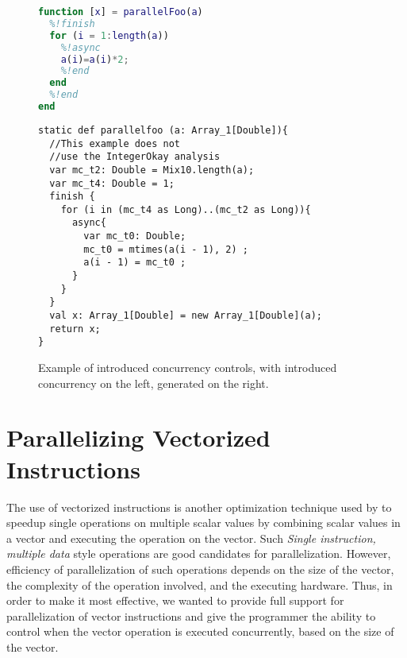 \begin{figure}[htbp]
\begin{minipage}{0.3\linewidth}

\begin{lstlisting}[language=Matlab,numbers=none]       
function [x] = parallelFoo(a)    
  %!finish
  for (i = 1:length(a))
    %!async
    a(i)=a(i)*2;
    %!end	
  end
  %!end
end                                                                             
\end{lstlisting}

\end{minipage}\hfill
\begin{minipage}{0.6\linewidth}
\begin{lstlisting}[language=X10,numbers=none]                                   
static def parallelfoo (a: Array_1[Double]){
  //This example does not 
  //use the IntegerOkay analysis
  var mc_t2: Double = Mix10.length(a);
  var mc_t4: Double = 1;
  finish {
    for (i in (mc_t4 as Long)..(mc_t2 as Long)){
      async{
        var mc_t0: Double;
        mc_t0 = mtimes(a(i - 1), 2) ;
        a(i - 1) = mc_t0 ;
      }
    }
  }
  val x: Array_1[Double] = new Array_1[Double](a);
  return x;
}
\end{lstlisting}
\end{minipage}

\caption{Example of introduced concurrency controls, \matlab with
introduced concurrency on the left, generated \xten on the right.}\label{fig:concex}
\end{figure}

\section{Parallelizing Vectorized Instructions} 
The use of vectorized instructions is another optimization technique
used by \matlab to speedup single operations on multiple scalar values by
combining scalar values in a vector and executing the operation on the
vector.  Such \emph{Single instruction, multiple data} style operations
are good candidates for parallelization. However, efficiency of
parallelization of such operations depends on the size of the vector,
the complexity of the operation involved, and the executing hardware. Thus,
in order to make it most effective, we wanted to provide full support
for parallelization of vector instructions and give the programmer the
ability to control when the vector operation is executed concurrently,
based on the size of the vector. 

